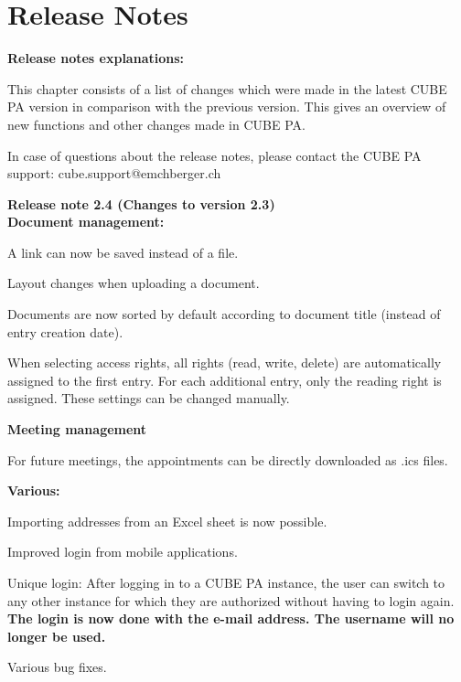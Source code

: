 
\clearpage
\section{Release Notes}

\textbf{Release notes explanations:}

\vspace{\baselineskip}

This chapter consists of a list of changes which were made in the latest CUBE PA version in comparison with the previous version. This gives an overview of new functions and other changes made in CUBE PA.

\vspace{\baselineskip}

In case of questions about the release notes, please contact the CUBE PA support: {\color{red} cube.support@emchberger.ch}

\vspace{\baselineskip}

\textbf{Release note 2.4 (Changes to version 2.3)} \\

\textbf{Document management:}
\begin{compactitem}
	\item A link can now be saved instead of a file.
	\item Layout changes when uploading a document.
	\item Documents are now sorted by default according to document title (instead of entry creation date).
	\item When selecting access rights, all rights (read, write, delete) are automatically assigned to the first entry. For each additional entry, only the reading right is assigned. These settings can be changed manually.
\end{compactitem}
\textbf{Meeting management}
\begin{compactitem}
	\item For future meetings, the appointments can be directly downloaded as .ics files.
\end{compactitem}
\textbf{Various:}
\begin{compactitem}
	\item Importing addresses from an Excel sheet is now possible.
	\item Improved login from mobile applications.
	\item Unique login: After logging in to a CUBE PA instance, the user can switch to any other instance for which they are authorized without having to login again. \textbf{The login is now done with the e-mail address. The username will no longer be used.}
	\item Various bug fixes.
\end{compactitem}

